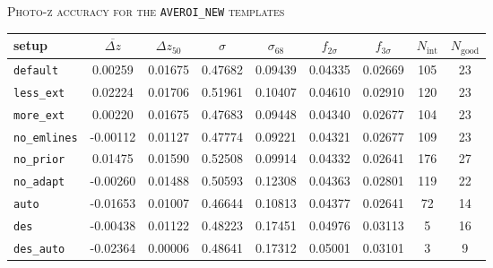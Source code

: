 \begin{table}[hb]
\setlength{\tabcolsep}{0.5em}

\centering
\textsc{Photo-z accuracy for the \texttt{AVEROI\_NEW} templates} \\
\vspace{0.1em}
\footnotesize
\begin{tabular}{lcccccccc}
\toprule\toprule
setup & $\overbar{\Delta z}$ & $\Delta z_{50}$ & $\sigma$ & $\sigma_{68}$ &  $f_{2\sigma}$ & $f_{3\sigma}$ & $N_{\mathrm{int}}$ & $N_{\mathrm{good}}$ \\
\midrule
\texttt{default} & 0.00259 & 0.01675 & 0.47682 & 0.09439 & 0.04335 & 0.02669 & 105 & 23 \\
\texttt{less\_ext} & 0.02224 & 0.01706 & 0.51961 & 0.10407 & 0.04610 & 0.02910 & 120 & 23 \\
\texttt{more\_ext} & 0.00220 & 0.01675 & 0.47683 & 0.09448 & 0.04340 & 0.02677 & 104 & 23 \\
\texttt{no\_emlines} & -0.00112 & 0.01127 & 0.47774 & 0.09221 & 0.04321 & 0.02677 & 109 & 23 \\
\texttt{no\_prior} & 0.01475 & 0.01590 & 0.52508 & 0.09914 & 0.04332 & 0.02641 & 176 & 27 \\
\texttt{no\_adapt} & -0.00260 & 0.01488 & 0.50593 & 0.12308 & 0.04363 & 0.02801 & 119 & 22 \\
\texttt{auto} & -0.01653 & 0.01007 & 0.46644 & 0.10813 & 0.04377 & 0.02641 & 72 & 14 \\
\texttt{des} & -0.00438 & 0.01122 & 0.48223 & 0.17451 & 0.04976 & 0.03113 & 5 & 16 \\
\texttt{des\_auto} & -0.02364 & 0.00006 & 0.48641 & 0.17312 & 0.05001 & 0.03101 & 3 & 9 \\
\bottomrule
\end{tabular}

\vspace{2em}


\end{table}
